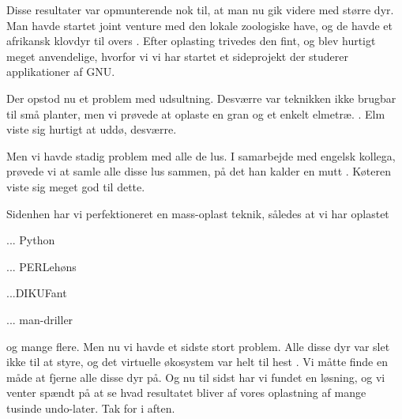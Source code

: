 \documentclass[a4paper,11pt]{article}
\begin{document}
\begin{sketch}
   Disse resultater var opmunterende nok til, at man nu gik videre med
  større dyr. Man havde startet joint venture med den lokale zoologiske have, og
  de havde et afrikansk klovdyr til overs . Efter
  oplasting trivedes den fint, og blev hurtigt meget anvendelige, hvorfor vi vi
  har startet et sideprojekt der studerer applikationer af GNU.

 Der opstod nu et problem med udsultning. Desværre var
teknikken ikke brugbar til små planter, men vi prøvede at oplaste en
gran og et enkelt elmetræ. . Elm viste sig hurtigt at uddø, desværre.

 Men vi havde stadig problem med alle de lus. I samarbejde med engelsk
kollega, prøvede vi at samle alle disse lus sammen, på det han kalder en mutt
. Køteren viste sig meget god til dette.

 Sidenhen har vi perfektioneret en mass-oplast teknik,
således at vi har oplastet 

 ... Python

 ... PERLehøns

 ...DIKUFant

 ... man-driller 

 og mange flere. Men nu vi havde et sidste stort problem. Alle disse dyr
var slet ikke til at styre, og det virtuelle økosystem var helt til hest
. Vi måtte finde en måde at fjerne alle
disse dyr på. Og nu til sidst har vi fundet en løsning, og vi venter spændt på at
se hvad resultatet bliver af vores oplastning af mange tusinde  undo-later. Tak for i aften.



\end{sketch}
\end{document}

